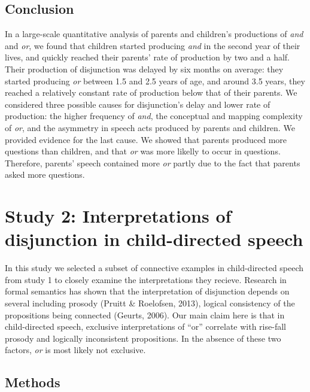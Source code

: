 \documentclass[,man,floatsintext]{apa6}
\begin{document}
\hypertarget{study1discussion}{%
\subsection{Conclusion}\label{study1discussion}}

In a large-scale quantitative analysis of parents and children's productions of \emph{and} and \emph{or}, we found that children started producing \emph{and} in the second year of their lives, and quickly reached their parents' rate of production by two and a half. Their production of disjunction was delayed by six months on average: they started producing \emph{or} between 1.5 and 2.5 years of age, and around 3.5 years, they reached a relatively constant rate of production below that of their parents. We considered three possible causes for disjunction's delay and lower rate of production: the higher frequency of \emph{and}, the conceptual and mapping complexity of \emph{or}, and the asymmetry in speech acts produced by parents and children. We provided evidence for the last cause. We showed that parents produced more questions than children, and that \emph{or} was more likelly to occur in questions. Therefore, parents' speech contained more \emph{or} partly due to the fact that parents asked more questions.

\hypertarget{study-2-interpretations-of-disjunction-in-child-directed-speech}{%
\section{Study 2: Interpretations of disjunction in child-directed speech}\label{study-2-interpretations-of-disjunction-in-child-directed-speech}}

In this study we selected a subset of connective examples in child-directed speech from study 1 to closely examine the interpretations they recieve. Research in formal semantics has shown that the interpretation of disjunction depends on several including prosody (Pruitt \& Roelofsen, 2013), logical consistency of the propositions being connected (Geurts, 2006). Our main claim here is that in child-directed speech, exclusive interpretations of \enquote{or} correlate with rise-fall prosody and logically inconsistent propositions. In the absence of these two factors, \emph{or} is most likely not exclusive.

\hypertarget{methods-1}{%
\subsection{Methods}\label{methods-1}}
\end{document}
